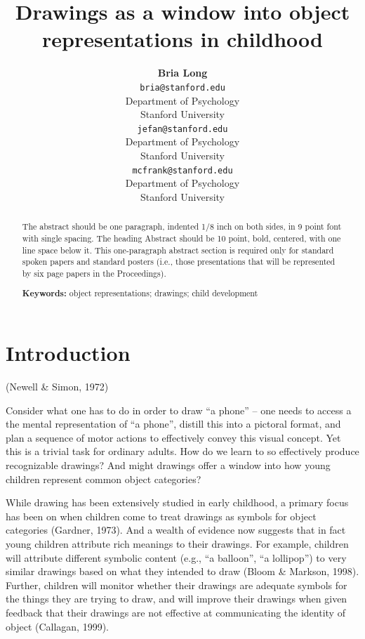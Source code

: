 \documentclass[10pt, letterpaper]{article}
\title{Drawings as a window into object representations in childhood}
\author{{\large \bf Bria Long} \\ \texttt{bria@stanford.edu} \\ Department of Psychology \\ Stanford University \And {\large \bf Judy Fan} \\ \texttt{jefan@stanford.edu} \\ Department of Psychology \\ Stanford University \And {\large \bf Michael C. Frank } \\ \texttt{mcfrank@stanford.edu} \\ Department of Psychology \\ Stanford University}
\begin{document}
\maketitle

\begin{abstract}
The abstract should be one paragraph, indented 1/8 inch on both sides,
in 9 point font with single spacing. The heading Abstract should be 10
point, bold, centered, with one line space below it. This one-paragraph
abstract section is required only for standard spoken papers and
standard posters (i.e., those presentations that will be represented by
six page papers in the Proceedings).

\textbf{Keywords:}
object representations; drawings; child development
\end{abstract}

\section{Introduction}\label{introduction}

(Newell \& Simon, 1972)

Consider what one has to do in order to draw ``a phone'' -- one needs to
access a the mental representation of ``a phone'', distill this into a
pictoral format, and plan a sequence of motor actions to effectively
convey this visual concept. Yet this is a trivial task for ordinary
adults. How do we learn to so effectively produce recognizable drawings?
And might drawings offer a window into how young children represent
common object categories?

While drawing has been extensively studied in early childhood, a primary
focus has been on when children come to treat drawings as symbols for
object categories (Gardner, 1973). And a wealth of evidence now suggests
that in fact young children attribute rich meanings to their drawings.
For example, children will attribute different symbolic content (e.g.,
``a balloon'', ``a lollipop'') to very similar drawings based on what
they intended to draw (Bloom \& Markson, 1998). Further, children will
monitor whether their drawings are adequate symbols for the things they
are trying to draw, and will improve their drawings when given feedback
that their drawings are not effective at communicating the identity of
object (Callagan, 1999).
\end{document}

